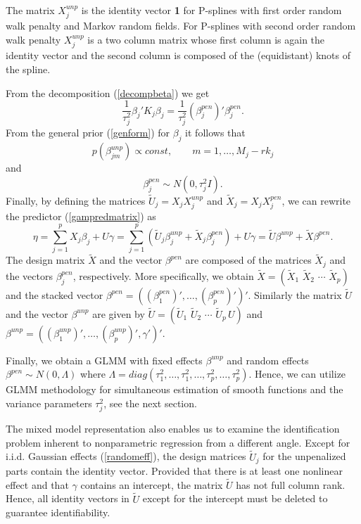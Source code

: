 \documentclass[11pt,a4paper,twoside]{bayesxarticle}
\begin{document}
The matrix $X_j^{unp}$ is the identity vector {\bf 1} for
P-splines with first order random walk penalty and Markov random
fields. For P-splines with second order random walk penalty
$X_j^{unp}$ is a two column matrix whose first column is again the
identity vector and the second column is composed of the
(equidistant) knots of the spline.

From the decomposition (\ref{decompbeta}) we get
$$
\frac{1}{\tau^2_j} \beta_j' K_j \beta_j = \frac{1}{\tau^2_j}
(\beta_j^{pen})' \beta_j^{pen}.
$$
From the general prior (\ref{genform}) for $\beta_j$ it follows
that
$$
p(\beta_{jm}^{unp}) \propto const , \qquad m=1,\dots, M_j-rk_j
$$
and
\begin{equation}
\label{priorunp} \beta_j^{pen} \sim N(0,\tau_j^2 I).
\end{equation}
Finally, by defining the matrices $\tilde{U}_j = X_j X_j^{unp}$
and $\tilde{X}_j = X_j X_j^{pen}$, we can rewrite the predictor
(\ref{gampredmatrix}) as
$$
\eta = \sum_{j=1}^{p} X_j \beta_j  + U \gamma
     = \displaystyle \sum_{j=1}^{p}  (\tilde{U}_j \beta_j^{unp} + \tilde{X}_j
     \beta_j^{pen}) +  U \gamma
= \displaystyle \tilde{U} \beta^{unp} + \tilde{X} \beta^{pen}.
$$
The design matrix $\tilde{X}$ and the vector $\beta^{pen}$ are
composed of the matrices $\tilde{X}_j$ and the vectors
$\beta_j^{pen}$, respectively. More specifically, we obtain
$\tilde{X} = (\tilde{X}_1 \,\, \tilde{X}_2 \,\, \cdots \,\,
\tilde{X}_p) $ and the stacked vector $\beta^{pen} =
((\beta_1^{pen})',\dots,(\beta_p^{pen})')'$. Similarly the matrix
$\tilde{U}$ and the vector $\beta^{unp}$ are given by $\tilde{U} =
(\tilde{U}_1 \,\, \tilde{U}_2 \,\, \cdots \,\, \tilde{U}_p \, U)$
and $\beta^{unp} =
((\beta_1^{unp})',\dots,(\beta_p^{unp})',\gamma')'$.

Finally, we obtain a GLMM with fixed effects $\beta^{unp}$ and
random effects $\beta^{pen} \sim N(0,\Lambda)$ where $\Lambda =
diag(\tau^2_1,\dots,\tau^2_1,\dots,\tau^2_p,\dots,\tau^2_p)$.
Hence, we can utilize GLMM methodology for simultaneous estimation
of smooth functions and the variance parameters $\tau^2_j$, see
the next section.

The mixed model representation also enables us to examine the
identification problem inherent to nonparametric regression from a
different angle. Except for i.i.d. Gaussian effects
(\ref{randomeff}), the design matrices $\tilde{U}_j$ for the
unpenalized parts contain the identity vector.  Provided that
there is at least one nonlinear effect and that $\gamma$ contains
an intercept, the matrix $\tilde{U}$ has not full column rank.
Hence, all identity vectors in $\tilde{U}$ except for the
intercept must be deleted to guarantee identifiability.
\end{document}
